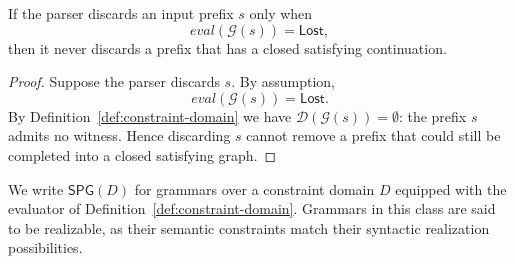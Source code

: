\begin{lemma}
\label{lem:safe-pruning}
If the parser discards an input prefix \(s\) only when
\[
  \mathit{eval}(\mathcal G(s)) = \mathsf{Lost},
\]
then it never discards a prefix that has a closed satisfying continuation.
\end{lemma}

\begin{proof}
Suppose the parser discards \(s\). By assumption,
\[
  \mathit{eval}(\mathcal G(s)) = \mathsf{Lost}.
\]
By Definition~\ref{def:constraint-domain} we have
\(\mathcal D(\mathcal G(s)) = \emptyset\): the prefix \(s\) admits no witness.
Hence discarding \(s\) cannot remove a prefix that could still be completed into a closed satisfying graph.
\end{proof}

\noindent We write \(\mathsf{SPG}(D)\) for grammars over a constraint domain \(D\) equipped with the evaluator of Definition~\ref{def:constraint-domain}. Grammars in this class are said to be realizable, as their semantic constraints match their syntactic realization possibilities.

